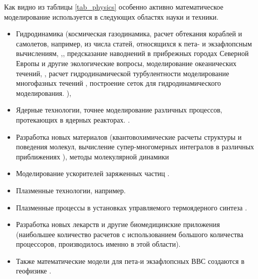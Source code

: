 Как видно из таблицы \ref{tab_physics} особенно активно математическое моделирование используется в следующих областях науки и техники.  
\begin{itemize}
	\item Гидродинамика (космическая газодинамика, расчет обтекания кораблей и самолетов, например, из числа статей, относящихся к пета- и экзафлопсным вычислениям, \cite{Onishi2014},\cite{Lu2015,Peterson1989}, предсказание наводнений в прибрежных городах Северной Европы и другие экологические вопросы, моделирование океанических течений, \cite{STERN20151,Newman20152086,Reuter2015325,Walker2014287}, расчет гидродинамической турбулентности %
	\cite{Mininni2011316,Appeloe201019,Yokota2013445,Tucker2016,Kotov2016189}  моделирование многофазных течений \cite{Safi2016170,Zaspel2016505}, построение сеток для гидродинамического моделирования. \cite{Shang2013381,Yilmaz2013388,Ono20142336,Yilmaz2013773}),
	\item Ядерные технологии, точнее моделирование различных процессов, протекающих в ядерных реакторах. \cite{Romano2013274,Romano201320,Romano201590,Boyd201443,Gong2012588,Gong20116010,Bergmann2015176,Bauge201432,Siegel20123119,Horelik2014646,Tramm2016,Bandura20103485,Beane20111,Savage2012140,Tramm2015195,Savage2012140,Patterson201697,Stan200920}.	
	\item Разработка новых материалов (квантовохимические расчеты структуры и поведения молекул, вычисление супер-многомерных интегралов в различных приближениях \cite{Ono2015}), методы молекулярной динамики \cite{Valiev20101477,Aguilar20132197,Yokota201317,Ohno20142575,Xu2015200}
	\item Моделирование ускорителей заряженных частиц \cite{Silva2014229}. 
	\item Плазменные технологии, например\cite{BirdsallIEEE}.
	\item Плазменные процессы в установках управляемого термоядерного синтеза
	\cite{KatesHarbeck2016231,Winkel2015456,Minoshima201381,Kumar20132251,Decyk2014,Acebron2013224}. 
	\item Разработка новых лекарств и другие биомедицинские приложения \cite{Stone2015,Joshi2011200,Saraladevi2015596,Blau20132856,Wang2012254,Markram201139,Markowitz2015730} (наибольшее количество расчетов с использованием большого количества процессоров, производилось именно в этой области). 
	
	\item Также математические модели для пета-и экзафлопсных ВВС создаются в геофизике \cite{Christen2012956,Nakajima20131265,Zhong2015197,Reed20131,Hodges201316,Furumura20111448}.
\end{itemize}


